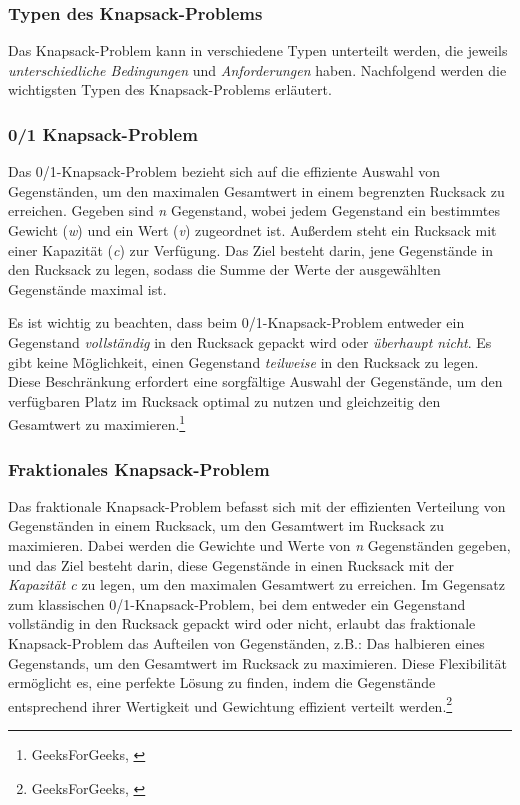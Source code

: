 \begin{itemize}
\subsubsection{Typen des Knapsack-Problems}\label{sec:knapsackTypen}
Das Knapsack-Problem kann in verschiedene Typen unterteilt werden, die jeweils \textit{unterschiedliche Bedingungen}
und \textit{Anforderungen} haben. Nachfolgend werden die wichtigsten Typen des Knapsack-Problems erläutert.

\subsubsection*{0/1 Knapsack-Problem}
Das 0/1-Knapsack-Problem bezieht sich auf die effiziente Auswahl von Gegenständen, um den maximalen Gesamtwert in einem
begrenzten Rucksack zu erreichen. Gegeben sind \textit{n} Gegenstand, wobei jedem Gegenstand ein bestimmtes Gewicht
(\textit{w}) und ein Wert (\textit{v}) zugeordnet ist. Außerdem steht ein Rucksack mit einer Kapazität (\textit{c}) zur
Verfügung. Das Ziel besteht darin, jene Gegenstände in den Rucksack zu legen, sodass die Summe der Werte der ausgewählten
Gegenstände maximal ist.

Es ist wichtig zu beachten, dass beim 0/1-Knapsack-Problem entweder ein Gegenstand \textit{vollständig} in den Rucksack
gepackt wird oder \textit{überhaupt nicht}. Es gibt keine Möglichkeit, einen Gegenstand \textit{teilweise} in den Rucksack
zu legen. Diese Beschränkung erfordert eine sorgfältige Auswahl der Gegenstände, um den verfügbaren Platz im Rucksack
optimal zu nutzen und gleichzeitig den Gesamtwert zu maximieren.\footnote{GeeksForGeeks, \cite{0/1 Knapsack-Problem}}

\subsubsection*{Fraktionales Knapsack-Problem}
Das fraktionale Knapsack-Problem befasst sich mit der effizienten Verteilung von Gegenständen in einem Rucksack, um den
Gesamtwert im Rucksack zu maximieren. Dabei werden die Gewichte und Werte von \textit{n} Gegenständen gegeben, und das
Ziel besteht darin, diese Gegenstände in einen Rucksack mit der \textit{Kapazität c} zu legen, um den maximalen Gesamtwert
zu erreichen. Im Gegensatz zum klassischen 0/1-Knapsack-Problem, bei dem entweder ein Gegenstand vollständig in den Rucksack
gepackt wird oder nicht, erlaubt das fraktionale Knapsack-Problem das Aufteilen von Gegenständen, z.B.: Das halbieren
eines Gegenstands, um den Gesamtwert im Rucksack zu maximieren. Diese Flexibilität ermöglicht es, eine perfekte Lösung
zu finden, indem die Gegenstände entsprechend ihrer Wertigkeit und Gewichtung effizient verteilt werden.\footnote{GeeksForGeeks, \cite{Fractional Knapsack Problem}}


\end{itemize}
